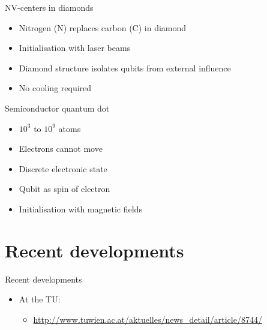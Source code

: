 \begin{frame}{NV-centers in diamonds}

\begin{itemize}
 \item Nitrogen (N) replaces carbon (C) in diamond
 \item Initialisation with laser beams
 \item Diamond structure isolates qubits from external influence
 \item No cooling required
\end{itemize}

\end{frame}


\begin{frame}{Semiconductor quantum dot}

\begin{itemize}
  \item $10^3$ to $10^9$ atoms
  \item Electrons cannot move
  \item Discrete electronic state
  \item Qubit as spin of electron
  \item Initialisation with magnetic fields  
\end{itemize}


\end{frame}

\section{Recent developments}

\begin{frame}{Recent developments}

	\begin{itemize}
 		\item At the TU:
        	\begin{itemize}
            	\item \url{http://www.tuwien.ac.at/aktuelles/news_detail/article/8744/}
            \end{itemize}
     \end{itemize}


\end{frame}